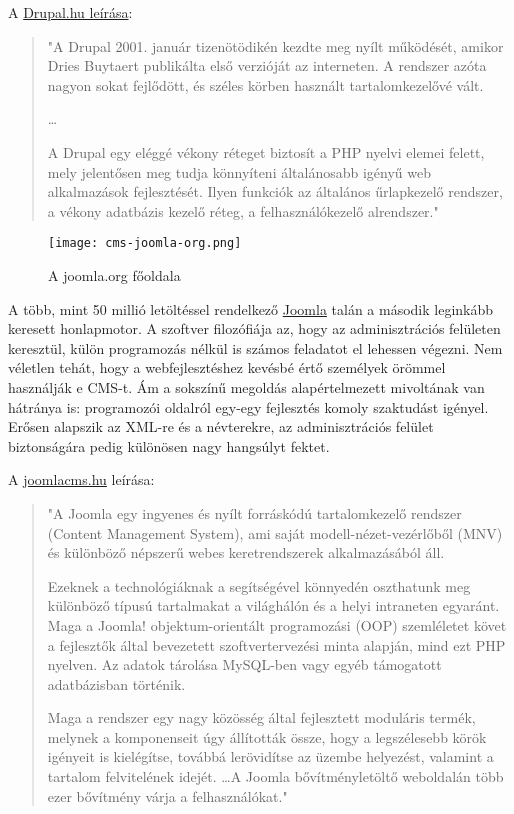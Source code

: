 A \href{https://www.drupal.hu/kezikonyv/tkr}{Drupal.hu leírása}:

\begin{quote}
"A Drupal 2001. január tizenötödikén kezdte meg nyílt működését, amikor Dries Buytaert publikálta első verzióját az interneten. A rendszer azóta nagyon sokat fejlődött, és széles körben használt tartalomkezelővé vált.

\dots

A Drupal egy eléggé vékony réteget biztosít a PHP nyelvi elemei felett, mely jelentősen meg tudja könnyíteni általánosabb igényű web alkalmazások fejlesztését. Ilyen funkciók az általános űrlapkezelő rendszer, a vékony adatbázis kezelő réteg, a felhasználókezelő alrendszer."
\end{quote}

\newpage


\begin{figure}
	\texttt{[image: cms-joomla-org.png]}
	\caption{A joomla.org főoldala}
\end{figure}

A több, mint 50 millió letöltéssel rendelkező \href{https://www.joomla.org/}{Joomla} talán a második leginkább keresett honlapmotor. A szoftver filozófiája az, hogy az adminisztrációs felületen keresztül, külön programozás nélkül is számos feladatot el lehessen végezni. Nem véletlen tehát, hogy a webfejlesztéshez kevésbé értő személyek örömmel használják e CMS-t. Ám a sokszínű megoldás alapértelmezett mivoltának van hátránya is: programozói oldalról egy-egy fejlesztés komoly szaktudást igényel. Erősen alapszik az XML-re és a névterekre, az adminisztrációs felület biztonságára pedig különösen nagy hangsúlyt fektet.

A \href{http://joomlacms.hu/joomla/mi-a-joomla}{joomlacms.hu} leírása:

\begin{quote}
"A Joomla egy ingyenes és nyílt forráskódú tartalomkezelő rendszer (Content Management System), ami saját modell-nézet-vezérlőből (MNV) és különböző népszerű webes keretrendszerek alkalmazásából áll.

Ezeknek a technológiáknak a segítségével könnyedén oszthatunk meg különböző típusú tartalmakat a világhálón és a helyi intraneten egyaránt. Maga a Joomla! objektum-orientált programozási (OOP) szemléletet követ a fejlesztők által bevezetett szoftvertervezési minta alapján, mind ezt PHP nyelven. Az adatok tárolása MySQL-ben vagy egyéb támogatott adatbázisban történik.

Maga a rendszer egy nagy közösség által fejlesztett moduláris termék, melynek a komponenseit úgy állították össze, hogy a legszélesebb körök igényeit is kielégítse, továbbá lerövidítse az üzembe helyezést, valamint a tartalom felvitelének idejét. \dots A Joomla bővítményletöltő weboldalán több ezer bővítmény várja a felhasználókat."
\end{quote}


